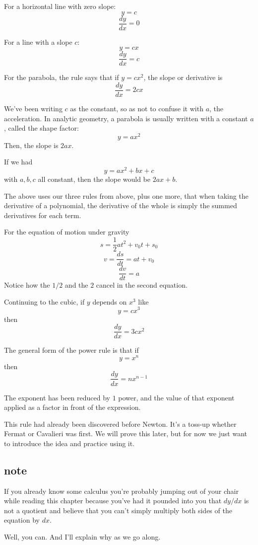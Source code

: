 \documentclass[11pt, oneside]{article}
\begin{document}
For a horizontal line with zero slope:
\[ y = c \]
\[ \frac{dy}{dx} = 0 \]

For a line with a slope $c$:
\[ y = cx \]
\[ \frac{dy}{dx} = c \]

For the parabola, the rule says that if $y = cx^2$, the slope or derivative is
\[ \frac{dy}{dx} = 2cx \]

We've been writing $c$ as the constant, so as not to confuse it with $a$, the acceleration.  In analytic geometry, a parabola is usually written with a constant $a$, called the shape factor:
\[ y = ax^2 \]
Then, the slope is $2ax$.  

If we had
\[ y = ax^2 + bx + c \]
with $a,b,c$ all constant, then the slope would be $2ax + b$.  

The above uses our three rules from above, plus one more, that when taking the derivative of a polynomial, the derivative of the whole is simply the summed derivatives for each term.

For the equation of motion under gravity
\[ s = \frac{1}{2} a t^2 + v_0 t + s_0 \]
\[ v = \frac{ds}{dt} = at + v_0 \]
\[ \frac{dv}{dt} = a \]
Notice how the $1/2$ and the $2$ cancel in the second equation.

Continuing to the cubic, if $y$ depends on $x^3$ like
\[ y = cx^3 \]
then
\[ \frac{dy}{dx} = 3cx^2 \]

The general form of the power rule is that if
\[ y = x^n \]
then
\[ \frac{dy}{dx} = n x^{n-1} \]

The exponent has been reduced by $1$ power, and the value of that exponent applied as a factor in front of the expression.

This rule had already been discovered before Newton.  It's a toss-up whether Fermat or Cavalieri was first.  We will prove this later, but for now we just want to introduce the idea and practice using it.

\subsection*{note}
If you already know some calculus you're probably jumping out of your chair while reading this chapter because you've had it pounded into you that $dy/dx$ is not a quotient and believe that you can't simply multiply both sides of the equation by $dx$.

Well, you can.  And I'll explain why as we go along.
\end{document}
